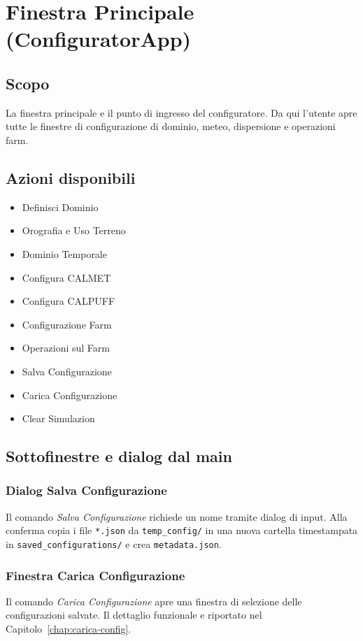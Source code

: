\chapter{Finestra Principale (ConfiguratorApp)}

\section{Scopo}
La finestra principale e il punto di ingresso del configuratore.
Da qui l'utente apre tutte le finestre di configurazione di dominio, meteo, dispersione e operazioni farm.

\section{Azioni disponibili}
\begin{itemize}[leftmargin=1.5em]
  \item Definisci Dominio
  \item Orografia e Uso Terreno
  \item Dominio Temporale
  \item Configura CALMET
  \item Configura CALPUFF
  \item Configurazione Farm
  \item Operazioni sul Farm
  \item Salva Configurazione
  \item Carica Configurazione
  \item Clear Simulazion
\end{itemize}

\section{Sottofinestre e dialog dal main}
\subsection{Dialog Salva Configurazione}
Il comando \emph{Salva Configurazione} richiede un nome tramite dialog di input.
Alla conferma copia i file \texttt{*.json} da \texttt{temp\_config/} in una nuova cartella timestampata in \texttt{saved\_configurations/} e crea \texttt{metadata.json}.

\subsection{Finestra Carica Configurazione}
Il comando \emph{Carica Configurazione} apre una finestra di selezione delle configurazioni salvate.
Il dettaglio funzionale e riportato nel Capitolo~\ref{chap:carica-config}.

